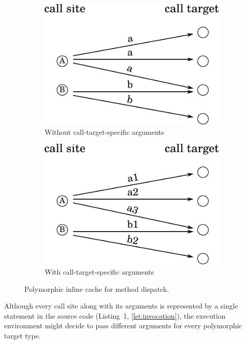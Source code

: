 \documentclass{sigplanconf} %
\begin{document}
\begin{figure}[!htp]
        \centering
        \begin{subfigure}{.45\linewidth}
          \includegraphics[width=.9\linewidth]{resources/pic_regular}
          \caption{Without call-target-specific arguments}
        \end{subfigure}
        \hfill
        \begin{subfigure}{.45\linewidth}
          \includegraphics[width=.9\linewidth]{resources/pic_calltarget}
          \caption{With call-target-specific arguments}
        \end{subfigure}
    \caption{Polymorphic inline cache for method dispatch.}
    \label{fig:pic_abstr}
\end{figure}

Although every call site along with its arguments is represented by a single statement in the source code (\eg Listing~1, \autoref{lst:invocation}), the execution environment might decide to pass different arguments for every polymorphic target type.
\end{document}

